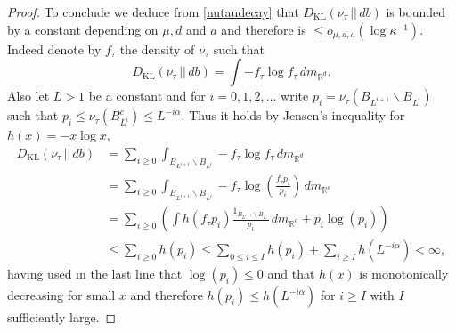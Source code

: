 \documentclass[10pt, english,oneside,reqno]{amsart}
\theoremstyle{plain}
\theoremstyle{remark}
\numberwithin{equation}{section}
\numberwithin{figure}{section}
\newcommand{\R}{\mathbb{R}}
\newcommand{\Haarof}[1]{m_{#1}}
\begin{document}
\begin{proof}
    To conclude we deduce from \eqref{nutaudecay} that $D_{\mathrm{KL}}( \nu_{\tau}  \, || \, db)$ is bounded by a constant depending on $\mu, d$ and $a $ and therefore is $\leq o_{\mu,d,a}(\log \kappa^{-1})$. Indeed denote by $f_{\tau}$ the density of $\nu_{\tau}$ such that $$D_{\mathrm{KL}}( \nu_{\tau}  \, || \, db) = \int -f_{\tau} \log f_{\tau} \, d\Haarof{\R^d}.$$ Also let $L > 1$ be a constant and for $i = 0,1,2,\ldots $  write $p_i = \nu_{\tau}(B_{L^{i+1}}\backslash B_{L^{i}})$ such that $p_i \leq \nu_{\tau}(B_{L^i}^c) \leq L^{-i\alpha}$. Thus it holds by Jensen's inequality for $h(x) = -x\log x$, 
    \begin{align*}
        D_{\mathrm{KL}}( \nu_{\tau}  \, || \, db) &= \sum_{i \geq 0} \int_{B_{L^{i+1}}\backslash B_{L^{i}}} -f_{\tau} \log f_{\tau} \, d\Haarof{\R^d} \\
        &= \sum_{i \geq 0} \int_{B_{L^{i+1}}\backslash B_{L^{i}}} -f_{\tau} \log \left( \frac{f_{\tau}p_i}{p_i} \right) \, d\Haarof{\R^d} \\
        &= \sum_{i \geq 0} \left(\int h(f_{\tau}p_i) \frac{1_{B_{L^{i+1}}\backslash B_{L^{i}}}}{p_i} \, d\Haarof{\R^d} + p_i\log(p_i) \right) \\
        &\leq \sum_{i \geq 0} h(p_i) \leq \sum_{0 \leq i \leq I} h(p_i) + \sum_{i \geq  I} h(L^{-i\alpha})  < \infty,
    \end{align*} having used in the last line that $\log(p_i) \leq 0$ and that $h(x)$ is monotonically decreasing for small $x$ and therefore $h(p_i) \leq h(L^{-i\alpha})$ for $i \geq I$ with $I$ sufficiently large.
    

\end{proof}
\end{document}
